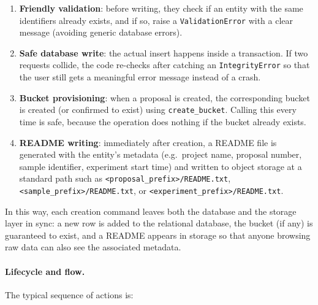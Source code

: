 \begin{enumerate}
	\item \textbf{Friendly validation}: before writing, they check if an entity with the same identifiers already exists, 
	and if so, raise a \texttt{ValidationError} with a clear message (avoiding generic database errors).
	\item \textbf{Safe database write}: the actual insert happens inside a transaction. 
	If two requests collide, the code re-checks after catching an \texttt{IntegrityError} 
	so that the user still gets a meaningful error message instead of a crash.
	\item \textbf{Bucket provisioning}: when a proposal is created, the corresponding bucket is created (or confirmed to exist) 
	using \texttt{create\_bucket}. Calling this every time is safe, because the operation does nothing if the bucket already exists.
	\item \textbf{README writing}: immediately after creation, a README file is generated with the entity’s metadata 
	(e.g.\ project name, proposal number, sample identifier, experiment start time) and written to object storage at a standard path 
	such as \texttt{<proposal\_prefix>/README.txt}, \texttt{<sample\_prefix>/README.txt}, or \texttt{<experiment\_prefix>/README.txt}.
\end{enumerate}

In this way, each creation command leaves both the database and the storage layer in sync:  
a new row is added to the relational database, the bucket (if any) is guaranteed to exist, and a README appears in storage 
so that anyone browsing raw data can also see the associated metadata.


\paragraph{Lifecycle and flow.}
The typical sequence of actions is:

